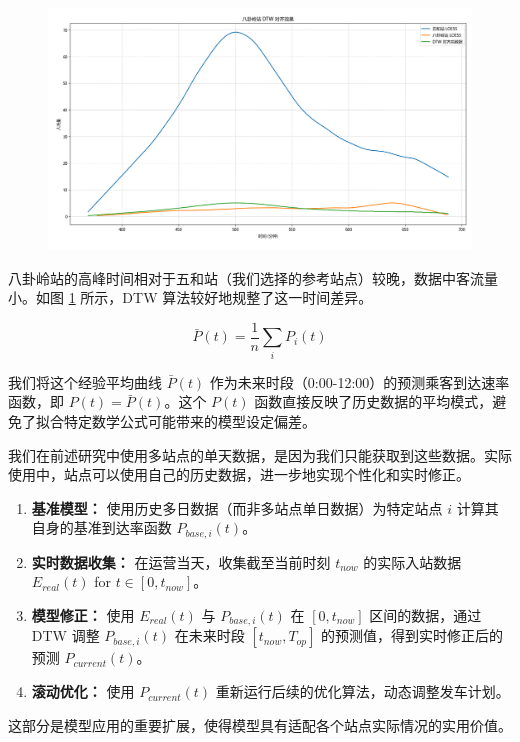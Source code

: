 \begin{figure}[htbp]
    \centering
    \includegraphics[width=1.0\textwidth]{res/Figure_5.png}
    \label{fig:alignedBagualing}
\end{figure}

八卦岭站的高峰时间相对于五和站（我们选择的参考站点）较晚，数据中客流量小。如图 \ref{fig:alignedBagualing} 所示，DTW 算法较好地规整了这一时间差异。

$$
\bar{P}(t) = \frac{1}{n} \sum_{i} P_i(t)
$$

我们将这个经验平均曲线 $\bar{P}(t)$ 作为未来时段（0:00-12:00）的预测乘客到达速率函数，即 $P(t) = \bar{P}(t)$。这个 $P(t)$ 函数直接反映了历史数据的平均模式，避免了拟合特定数学公式可能带来的模型设定偏差。


我们在前述研究中使用多站点的单天数据，是因为我们只能获取到这些数据。实际使用中，站点可以使用自己的历史数据，进一步地实现个性化和实时修正。
\begin{enumerate}
    \item \textbf{基准模型：} 使用历史多日数据（而非多站点单日数据）为特定站点 $i$ 计算其自身的基准到达率函数 $P_{base, i}(t)$。
    \item \textbf{实时数据收集：} 在运营当天，收集截至当前时刻 $t_{now}$ 的实际入站数据 $E_{real}(t)$ for $t \in [0, t_{now}]$。
    \item \textbf{模型修正：} 使用 $E_{real}(t)$ 与 $P_{base, i}(t)$ 在 $[0, t_{now}]$ 区间的数据，通过 DTW 调整 $P_{base, i}(t)$ 在未来时段 $[t_{now}, T_{op}]$ 的预测值，得到实时修正后的预测 $P_{current}(t)$。
    \item \textbf{滚动优化：} 使用 $P_{current}(t)$ 重新运行后续的优化算法，动态调整发车计划。
\end{enumerate}
这部分是模型应用的重要扩展，使得模型具有适配各个站点实际情况的实用价值。

